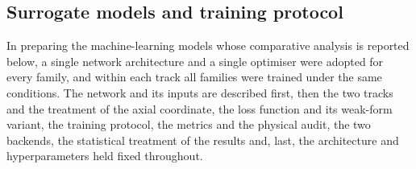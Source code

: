 \subsection{Surrogate models and training protocol}
\label{sec:models}

In preparing the machine-learning models whose comparative analysis is reported
below, a single network architecture and a single optimiser were adopted for
every family, and within each track all families were trained under the same
conditions. The network and its inputs
are described first, then the two tracks and the treatment of the axial
coordinate, the loss function and its weak-form variant, the training protocol,
the metrics and the physical audit, the two backends, the statistical
treatment of the results and, last, the architecture and hyperparameters held
fixed throughout.

